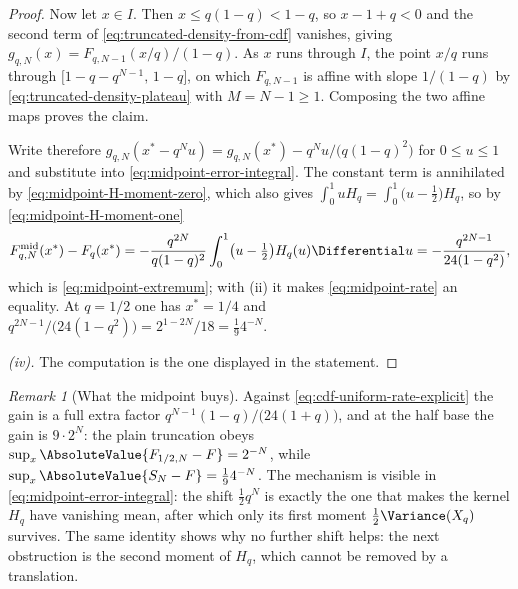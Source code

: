\documentclass[11pt,a4paper,oneside,openany]{book}
\theoremstyle{definition}
\theoremstyle{remark}
\newtheorem{remark}[remark]{Remark}
\begin{document}
\begin{proof}
Now let $x\in I$.  Then $x\le q(1-q)<1-q$, so $x-1+q<0$ and the second term of
\eqref{eq:truncated-density-from-cdf} vanishes, giving
$g_{q,N}(x)=F_{q,N-1}(x/q)/(1-q)$.  As $x$ runs through $I$, the point $x/q$ runs
through $\bigl[1-q-q^{N-1},\,1-q\bigr]$, on which $F_{q,N-1}$ is affine with slope
$1/(1-q)$ by \eqref{eq:truncated-density-plateau} with $M=N-1\ge1$.  Composing
the two affine maps proves the claim.

Write therefore
$g_{q,N}(x^\ast-q^Nu)=g_{q,N}(x^\ast)-q^Nu\big/\bigl(q(1-q)^2\bigr)$ for
$0\le u\le1$ and substitute into \eqref{eq:midpoint-error-integral}.  The
constant term is annihilated by \eqref{eq:midpoint-H-moment-zero}, which also
gives $\int_0^1uH_q=\int_0^1\bigl(u-\tfrac12\bigr)H_q$, so by
\eqref{eq:midpoint-H-moment-one}
\[
 F^{\mathrm{mid}}_{q,N}(x^\ast)-F_q(x^\ast)
 =-\frac{q^{2N}}{q(1-q)^2}\int_0^1\bigl(u-\tfrac12\bigr)H_q(u)\Differential u
 =-\frac{q^{2N-1}}{24(1-q^2)} ,
\]
which is \eqref{eq:midpoint-extremum}; with (ii) it makes
\eqref{eq:midpoint-rate} an equality.  At $q=1/2$ one has $x^\ast=1/4$ and
$q^{2N-1}/\bigl(24(1-q^2)\bigr)=2^{1-2N}\big/18=\tfrac194^{-N}$.

\emph{(iv).}  The computation is the one displayed in the statement.
\end{proof}

\begin{remark}[What the midpoint buys]\label{rem:midpoint-versus-plain}
Against \eqref{eq:cdf-uniform-rate-explicit} the gain is a full extra factor
$q^{N-1}(1-q)/\bigl(24(1+q)\bigr)$, and at the half base the gain is
$9\cdot2^{N}$: the plain truncation obeys
$\sup_x\AbsoluteValue{F_{1/2,N}-F}=2^{-N}$, while
$\sup_x\AbsoluteValue{S_N-F}=\tfrac194^{-N}$.  The mechanism is visible in
\eqref{eq:midpoint-error-integral}: the shift $\tfrac12q^N$ is exactly the one
that makes the kernel $H_q$ have vanishing mean, after which only its first
moment $\tfrac12\Variance(X_q)$ survives.  The same identity shows why no
further shift helps: the next obstruction is the second moment of $H_q$, which
cannot be removed by a translation.
\end{remark}


\end{document}
